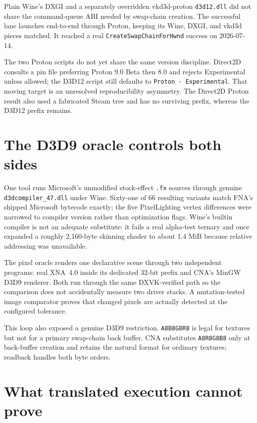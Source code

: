 Plain Wine's DXGI and a separately overridden vkd3d-proton \texttt{d3d12.dll} did not share the
command-queue ABI needed by swap-chain creation. The successful lane launches end-to-end through
Proton, keeping its Wine, DXGI, and vkd3d pieces matched. It reached a real
\texttt{CreateSwapChainForHwnd} success on 2026-07-14.

The two Proton scripts do not yet share the same version discipline. Direct2D consults a pin
file preferring Proton 9.0 Beta then 8.0 and rejects Experimental unless allowed; the D3D12
script still defaults to \texttt{Proton - Experimental}. That moving target is an unresolved
reproducibility asymmetry. The Direct2D Proton result also used a fabricated Steam tree and has
no surviving prefix, whereas the D3D12 prefix remains.

\section{The D3D9 oracle controls both sides}
\label{sec:d3d9-oracle}

One tool runs Microsoft's unmodified stock-effect \texttt{.fx} sources through genuine
\texttt{d3dcompiler\_47.dll} under Wine. Sixty-one of 66 resulting variants match FNA's shipped
Microsoft bytecode exactly; the five PixelLighting vertex differences were narrowed to compiler
version rather than optimization flags. Wine's builtin compiler is not an adequate substitute:
it fails a real alpha-test ternary and once expanded a roughly 2{,}160-byte skinning shader to
about 1.4 MiB because relative addressing was unavailable.

The pixel oracle renders one declarative scene through two independent programs: real XNA~4.0
inside its dedicated 32-bit prefix and CNA's MinGW D3D9 renderer. Both run through the same
DXVK-verified path so the comparison does not accidentally measure two driver stacks. A
mutation-tested image comparator proves that changed pixels are actually detected at the
configured tolerance.

This loop also exposed a genuine D3D9 restriction. \texttt{A8B8G8R8} is legal for textures but
not for a primary swap-chain back buffer. CNA substitutes \texttt{A8R8G8B8} only at back-buffer
creation and retains the natural format for ordinary textures; readback handles both byte
orders.

\section{What translated execution cannot prove}

